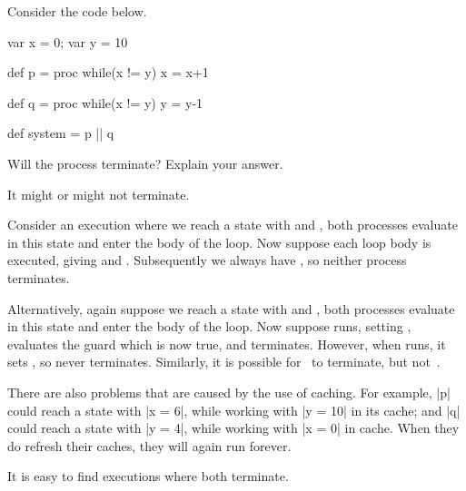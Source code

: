 \begin{question}
Consider the code below.
%
\begin{scala}
var x = 0; var y = 10

def p = proc{ while(x != y) x = x+1 }

def q = proc{ while(x != y) y = y-1 }

def system = p || q
\end{scala}
%
Will the process  terminate?  Explain your answer.
\end{question}
%
\begin{answer}
It might or might not terminate.

Consider an execution where we reach a state with  and ,
both processes evaluate  in this state and enter the body of the
loop.  Now suppose each loop body is executed, giving  and
.  Subsequently we always have , so neither process
terminates.

Alternatively, again suppose we reach a state with  and
, both processes evaluate  in this state and enter the
body of the loop.  Now suppose  runs, setting , evaluates
the guard which is now true, and terminates.  However, when  runs, it
sets , so never terminates.  Similarly, it is possible
for~ to terminate, but not~.

There are also problems that are caused by the use of caching.  For example,
|p| could reach a state with |x = 6|, while working with |y = 10| in its
cache; and |q| could reach a state with |y = 4|, while working with |x = 0| in
cache.  When they do refresh their caches, they will again run forever.  


It is easy to find executions where both terminate.
\end{answer}
